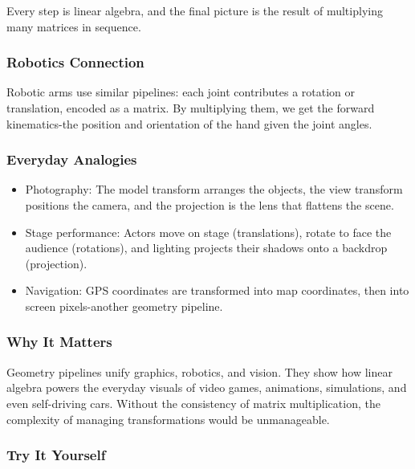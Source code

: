 \documentclass[
  letterpaper,
  DIV=11,
  numbers=noendperiod]{scrreprt}
\providecommand{\tightlist}{%
  \setlength{\itemsep}{0pt}\setlength{\parskip}{0pt}}
\begin{document}
Every step is linear algebra, and the final picture is the result of
multiplying many matrices in sequence.

\subsubsection{Robotics Connection}\label{robotics-connection}

Robotic arms use similar pipelines: each joint contributes a rotation or
translation, encoded as a matrix. By multiplying them, we get the
forward kinematics-the position and orientation of the hand given the
joint angles.

\subsubsection{Everyday Analogies}\label{everyday-analogies-86}

\begin{itemize}
\tightlist
\item
  Photography: The model transform arranges the objects, the view
  transform positions the camera, and the projection is the lens that
  flattens the scene.
\item
  Stage performance: Actors move on stage (translations), rotate to face
  the audience (rotations), and lighting projects their shadows onto a
  backdrop (projection).
\item
  Navigation: GPS coordinates are transformed into map coordinates, then
  into screen pixels-another geometry pipeline.
\end{itemize}

\subsubsection{Why It Matters}\label{why-it-matters-87}

Geometry pipelines unify graphics, robotics, and vision. They show how
linear algebra powers the everyday visuals of video games, animations,
simulations, and even self-driving cars. Without the consistency of
matrix multiplication, the complexity of managing transformations would
be unmanageable.

\subsubsection{Try It Yourself}\label{try-it-yourself-90}
\end{document}
